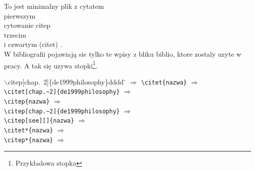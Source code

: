 \documentclass[a4paper, 12pt]{report}
\begin{document}
\noindent To jest minimalny plik z cytatem \\
pierwszym \cite{de1999philosophy} \\
 cytowanie citep \citep{johnson1980mental} \\
trzecim \cite{simon1980cognitive} \\
i czwartym (citet) \citet{norman1980twelve}. \\
W bibliografii pojawiają sie tylko te wpisy z bliku biblio, ktore zostaly uzyte w pracy.
A tak się uzywa stopki\footnote{Przykładowa stopka}.
\begin{tabbing}
  $\backslash$citep[chap.~2]\{de1999philosophy\}dddd \qquad\= $\Rightarrow$ \qquad\= \citep[chap.~2]{de1999philosophy} \kill
  \verb!\citet{nazwa}! \> $\Longrightarrow$ \> \citet{de1999philosophy} \\
  \verb!\citet[chap.~2]{de1999philosophy}! \> $\Longrightarrow$ \> \citet[rodzdział.~2]{de1999philosophy} \\
  \verb!\citep{nazwa}! \> $\Longrightarrow$ \>  \citep{de1999philosophy} \\
  \verb!\citep[chap.~2]{de1999philosophy}! \> $\Longrightarrow$ \> \citep[chap.~2]{de1999philosophy} \\
  \verb!\citep[see][]{nazwa}! \> $\Longrightarrow$ \> \citep[zobacz][]{de1999philosophy} \\
  \verb!\citet*{nazwa}! \> $\Longrightarrow$ \> \citet*{de1999philosophy} \\
  \verb!\citep*{nazwa}! \> $\Longrightarrow$ \> \citep*{de1999philosophy} \\
\end{tabbing}


\end{document}
